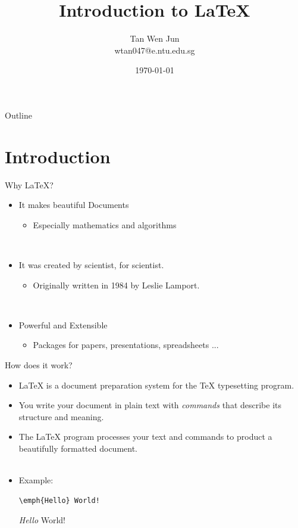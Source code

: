 \documentclass[c]{beamer}
\begin{document}
\title{Introduction to \LaTeX}
\author{Tan Wen Jun \\ wtan047@e.ntu.edu.sg}
\date{\today}

\begin{frame} %
  \titlepage
\end{frame}

\begin{frame}{Outline}
  \tableofcontents
\end{frame}

\section{Introduction}

\begin{frame}{Why \LaTeX?}
  \begin{itemize}
    \item It makes beautiful Documents
    \begin{itemize}
      \item Especially mathematics and algorithms
    \end{itemize}
    ~
    \item It was created by scientist, for scientist.
    \begin{itemize}
      \item Originally written in 1984 by Leslie Lamport.
    \end{itemize}
    ~
    \item Powerful and Extensible
    \begin{itemize}
      \item Packages for papers, presentations, spreadsheets ...
    \end{itemize}
  \end{itemize}
\end{frame}

\begin{frame}[fragile]{How does it work?}
  \begin{itemize}
    \item \LaTeX{} is a document preparation system for the \TeX{}  typesetting program.
    
    \item You write your document in plain text with \emph{commands} that describe its structure and meaning.
    
    \item The \LaTeX{} program processes your text and commands to product a beautifully formatted document.\\
    ~
    \item Example: 
    
\begin{lstlisting}
\emph{Hello} World!
\end{lstlisting}

    \emph{Hello} World!
  \end{itemize}
\end{frame}
\end{document}
